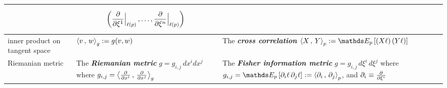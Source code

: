 \documentclass[11pt]{article}
\begin{document}
\begin{table}[h!]
\begin{tabularx}{1\textwidth} { 
  | >{\raggedright\arraybackslash} m{3cm}
  | >{\centering\arraybackslash}X
  | >{\centering\arraybackslash}X  | }
\begin{align*}
\end{align*}
\vspace{-1em}
&   
\vspace{-1.25em}
\begin{align*}
\begin{array}{c}
\left(\dfrac{\partial }{\partial \xi^{1}}\Bigr|_{\ell(p)} \,{,}\ldots{,}\, \dfrac{\partial }{\partial \xi^{n}}\Bigr|_{\ell(p)}\right)
\end{array}
\end{align*} \vspace{-1em}\\
\hline
inner product on tangent space &\vspace{1em}  $\left\langle v\,,\, w \right\rangle_{g}:= g(v, w)$ \vspace{1em}& The \textbf{\emph{cross correlation}} $\inn{X}{Y}_{p} := \E{p}{(X\ell)\,(Y\ell)}$ \\
\hline
Riemanian metric &\vspace{1em} The \textbf{\emph{Riemanian metric}} $g = g_{i,j}\,dx^i dx^j$ where $g_{i,j}= \left\langle \frac{\partial }{ \partial x^i}\,,\, \frac{\partial }{ \partial x^j} \right\rangle_{g}$ \vspace{1em}& The \textbf{\emph{Fisher information metric}} $g = g_{i,j}\,d\xi^i\, d\xi^j$ where $g_{i,j} = \E{p}{\partial_{i}\ell\,\partial_{j}\ell}:= \inn{\partial_{i}}{\partial_{j}}_{p}$, and $\partial_i \equiv \frac{\partial }{ \partial \xi^i}$  \\

\end{tabularx}
\end{table}
\end{document}
